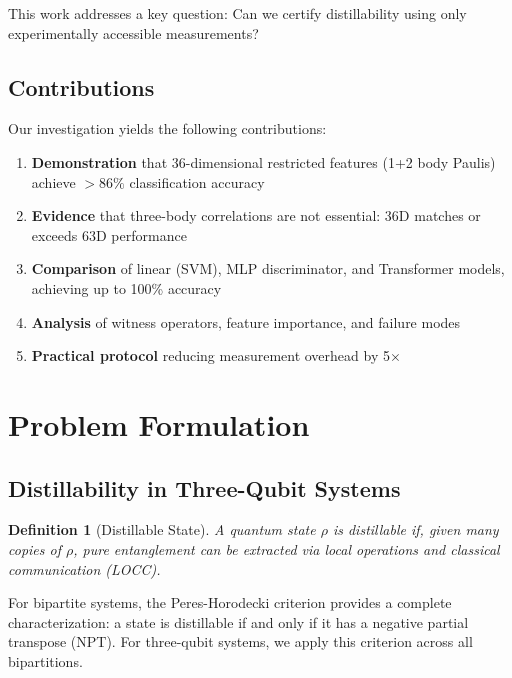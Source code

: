 \documentclass[11pt,a4paper]{article}
\newtheorem{definition}{Definition}
\begin{document}
This work addresses a key question: Can we certify distillability using only experimentally accessible measurements?

\subsection{Contributions}

Our investigation yields the following contributions:

\begin{enumerate}[noitemsep]
    \item \textbf{Demonstration} that 36-dimensional restricted features (1+2 body Paulis) achieve $>86\%$ classification accuracy
    \item \textbf{Evidence} that three-body correlations are not essential: 36D matches or exceeds 63D performance
    \item \textbf{Comparison} of linear (SVM), MLP discriminator, and Transformer models, achieving up to 100\% accuracy
    \item \textbf{Analysis} of witness operators, feature importance, and failure modes
    \item \textbf{Practical protocol} reducing measurement overhead by 5$\times$
\end{enumerate}

\section{Problem Formulation}

\subsection{Distillability in Three-Qubit Systems}

\begin{definition}[Distillable State]
A quantum state $\rho$ is \emph{distillable} if, given many copies of $\rho$, pure entanglement can be extracted via local operations and classical communication (LOCC).
\end{definition}

For bipartite systems, the Peres-Horodecki criterion provides a complete characterization: a state is distillable if and only if it has a negative partial transpose (NPT). For three-qubit systems, we apply this criterion across all bipartitions.
\end{document}
